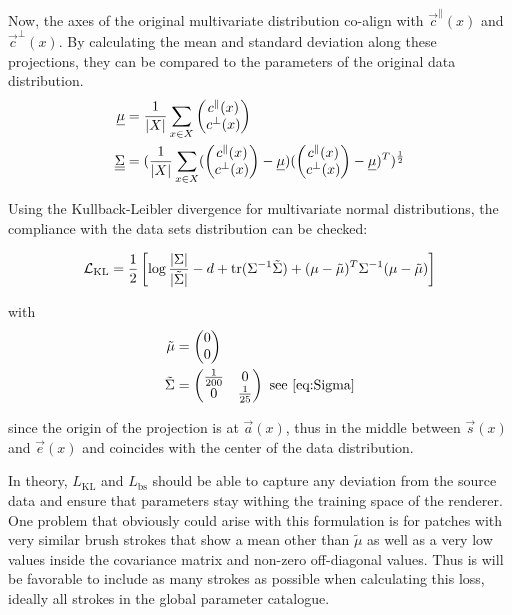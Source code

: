 Now, the axes of the original multivariate distribution co-align with $\vec{c}^\parallel(x)$
and $\vec{c}^\bot(x)$.
By calculating the mean and standard deviation along these projections, they can
be compared to the parameters of the original data distribution.
\begin{align}
    \underline\mu & = \frac{1}{\vert X \vert}\sum_{x \in X} \begin{pmatrix} c^\parallel(x) \\ c^\bot(x) \end{pmatrix} \\
    \underline{\underline{\Sigma}} & = (\frac{1}{\vert X \vert} \sum_{x \in X}
        (\begin{pmatrix} c^\parallel(x) \\ c^\bot(x) \end{pmatrix} - \underline\mu)
        (\begin{pmatrix} c^\parallel(x) \\ c^\bot(x) \end{pmatrix} - \underline\mu)^T
        )^{\frac{1}{2}} \\
\end{align}

Using the Kullback-Leibler divergence for multivariate normal distributions,
the compliance with the data sets distribution can be checked:

\begin{align}
    \mathcal{L}_{\text{KL}} = \frac{1}{2}\left[\log\frac{|\Sigma|}{|\tilde{\Sigma}|} - d + \text{tr} ( \Sigma^{-1}\tilde{\Sigma} ) + (\mu - \tilde{\mu})^T \Sigma^{-1}(\mu - \tilde{\mu})\right]
\end{align}

with 
\begin{align}
    \tilde{\mu} & = \begin{pmatrix} 0 \\ 0 \end{pmatrix} \\
    \tilde{\Sigma} & = \begin{pmatrix} \frac{1}{200} & 0 \\ 0 & \frac{1}{25} \end{pmatrix} \text{ see \eqref{eq:Sigma}}
\end{align}

since the origin of the projection is at $\vec{a}(x)$, thus in the middle between
$\vec{s}(x)$ and $\vec{e}(x)$ and coincides with the center of the data distribution.

In theory, $L_{\text{KL}}$ and $L_{\text{bs}}$ should be able to capture any deviation
from the source data and ensure that parameters stay withing the training space of
the renderer.
One problem that obviously could arise with this formulation is for patches with
very similar brush strokes that show a mean other than $\tilde{\mu}$ as well as 
a very low values inside the covariance matrix and non-zero off-diagonal values.
Thus is will be favorable to include as many strokes as possible when calculating
this loss, ideally all strokes in the global parameter catalogue.

